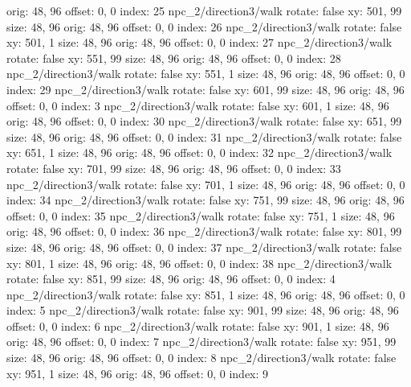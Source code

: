   orig: 48, 96
  offset: 0, 0
  index: 25
npc_2/direction3/walk
  rotate: false
  xy: 501, 99
  size: 48, 96
  orig: 48, 96
  offset: 0, 0
  index: 26
npc_2/direction3/walk
  rotate: false
  xy: 501, 1
  size: 48, 96
  orig: 48, 96
  offset: 0, 0
  index: 27
npc_2/direction3/walk
  rotate: false
  xy: 551, 99
  size: 48, 96
  orig: 48, 96
  offset: 0, 0
  index: 28
npc_2/direction3/walk
  rotate: false
  xy: 551, 1
  size: 48, 96
  orig: 48, 96
  offset: 0, 0
  index: 29
npc_2/direction3/walk
  rotate: false
  xy: 601, 99
  size: 48, 96
  orig: 48, 96
  offset: 0, 0
  index: 3
npc_2/direction3/walk
  rotate: false
  xy: 601, 1
  size: 48, 96
  orig: 48, 96
  offset: 0, 0
  index: 30
npc_2/direction3/walk
  rotate: false
  xy: 651, 99
  size: 48, 96
  orig: 48, 96
  offset: 0, 0
  index: 31
npc_2/direction3/walk
  rotate: false
  xy: 651, 1
  size: 48, 96
  orig: 48, 96
  offset: 0, 0
  index: 32
npc_2/direction3/walk
  rotate: false
  xy: 701, 99
  size: 48, 96
  orig: 48, 96
  offset: 0, 0
  index: 33
npc_2/direction3/walk
  rotate: false
  xy: 701, 1
  size: 48, 96
  orig: 48, 96
  offset: 0, 0
  index: 34
npc_2/direction3/walk
  rotate: false
  xy: 751, 99
  size: 48, 96
  orig: 48, 96
  offset: 0, 0
  index: 35
npc_2/direction3/walk
  rotate: false
  xy: 751, 1
  size: 48, 96
  orig: 48, 96
  offset: 0, 0
  index: 36
npc_2/direction3/walk
  rotate: false
  xy: 801, 99
  size: 48, 96
  orig: 48, 96
  offset: 0, 0
  index: 37
npc_2/direction3/walk
  rotate: false
  xy: 801, 1
  size: 48, 96
  orig: 48, 96
  offset: 0, 0
  index: 38
npc_2/direction3/walk
  rotate: false
  xy: 851, 99
  size: 48, 96
  orig: 48, 96
  offset: 0, 0
  index: 4
npc_2/direction3/walk
  rotate: false
  xy: 851, 1
  size: 48, 96
  orig: 48, 96
  offset: 0, 0
  index: 5
npc_2/direction3/walk
  rotate: false
  xy: 901, 99
  size: 48, 96
  orig: 48, 96
  offset: 0, 0
  index: 6
npc_2/direction3/walk
  rotate: false
  xy: 901, 1
  size: 48, 96
  orig: 48, 96
  offset: 0, 0
  index: 7
npc_2/direction3/walk
  rotate: false
  xy: 951, 99
  size: 48, 96
  orig: 48, 96
  offset: 0, 0
  index: 8
npc_2/direction3/walk
  rotate: false
  xy: 951, 1
  size: 48, 96
  orig: 48, 96
  offset: 0, 0
  index: 9

